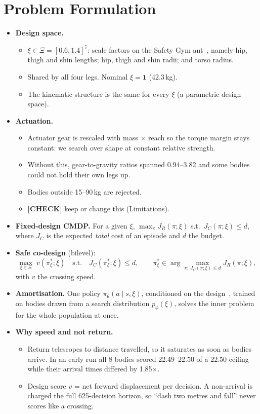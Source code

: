 \documentclass[sigconf,review]{acmart}
\newcommand{\statustag}[2]{\textcolor{#1}{\textsf{\scriptsize\bfseries[#2]}}}
\newcommand{\CHECK}{\statustag{orange!85!black}{CHECK}\hspace{0.3em}}
\newcommand{\sectarget}[1]{\par\noindent{\color{gray}\sffamily\scriptsize Target length: #1}\par\smallskip}
\begin{document}
\section{Problem Formulation}
\label{sec:problem}
\sectarget{0.5 page}
\begin{itemize}
\item \textbf{Design space.}
  \begin{itemize}
  \item $\xi \in \Xi = [0.6, 1.4]^7$: scale factors on the Safety Gym ant~\cite{ray2019benchmarking}, namely hip, thigh and shin lengths; hip, thigh and shin radii; and torso radius.
  \item Shared by all four legs. Nominal $\xi = \mathbf{1}$ (42.3\,kg).
  \item The kinematic structure is the same for every $\xi$ (a parametric design space).
  \end{itemize}
\item \textbf{Actuation.}
  \begin{itemize}
  \item Actuator gear is rescaled with mass $\times$ reach so the torque margin stays constant: we search over shape at constant relative strength.
  \item Without this, gear-to-gravity ratios spanned 0.94--3.82 and some bodies could not hold their own legs up.
  \item Bodies outside 15--90\,kg are rejected.
  \item \CHECK{} keep or change this (Limitations).
  \end{itemize}
\item \textbf{Fixed-design CMDP.} For a given $\xi$, $\max_\pi J_R(\pi;\xi)$ s.t.\ $J_C(\pi;\xi) \le d$, where $J_C$ is the expected \emph{total} cost of an episode and $d$ the budget.
\item \textbf{Safe co-design} (bilevel):
\begin{equation}
\max_{\xi \in \Xi}\; v(\pi^*_\xi;\xi) \quad \text{s.t.} \quad J_C(\pi^*_\xi;\xi) \le d,
\qquad \pi^*_\xi \in \arg\max_{\pi:\,J_C(\pi;\xi)\le d} J_R(\pi;\xi),
\label{eq:bilevel}
\end{equation}
with $v$ the crossing speed.
\item \textbf{Amortisation.} One policy $\pi_\theta(a \mid s, \xi)$, conditioned on the design~\cite{schaff2019jointly}, trained on bodies drawn from a search distribution $p_\phi(\xi)$, solves the inner problem for the whole population at once.
\item \textbf{Why speed and not return.}
  \begin{itemize}
  \item Return telescopes to distance travelled, so it saturates as soon as bodies arrive. In an early run all 8 bodies scored 22.49--22.50 of a 22.50 ceiling while their arrival times differed by 1.85$\times$.
  \item Design score $v$ = net forward displacement per decision. A non-arrival is charged the full 625-decision horizon, so ``dash two metres and fall'' never scores like a crossing.
  \end{itemize}
\end{itemize}
\end{document}
